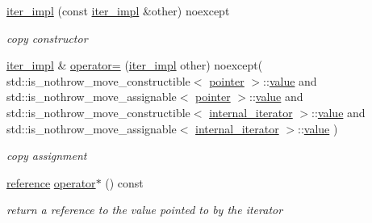 \begin{DoxyCompactItemize}
\item 
\hyperlink{classnlohmann_1_1basic__json_1_1iter__impl_a798792571cbbfc0e12025265b55498d2}{iter\+\_\+impl} (const \hyperlink{classnlohmann_1_1basic__json_1_1iter__impl}{iter\+\_\+impl} \&other) noexcept
\begin{DoxyCompactList}\small\item\em copy constructor \end{DoxyCompactList}\item 
\hyperlink{classnlohmann_1_1basic__json_1_1iter__impl}{iter\+\_\+impl} \& \hyperlink{classnlohmann_1_1basic__json_1_1iter__impl_a547f4519e43ff401010c21cc311b2546}{operator=} (\hyperlink{classnlohmann_1_1basic__json_1_1iter__impl}{iter\+\_\+impl} other) noexcept(                                       std\+::is\+\_\+nothrow\+\_\+move\+\_\+constructible$<$ \hyperlink{classnlohmann_1_1basic__json_1_1iter__impl_a3b56ff21ecdde2dc147288ee64cff0fd}{pointer} $>$\+::\hyperlink{classnlohmann_1_1basic__json_1_1iter__impl_a87177104a65f86ea6d324f334f0cca4e}{value} and                                       std\+::is\+\_\+nothrow\+\_\+move\+\_\+assignable$<$ \hyperlink{classnlohmann_1_1basic__json_1_1iter__impl_a3b56ff21ecdde2dc147288ee64cff0fd}{pointer} $>$\+::\hyperlink{classnlohmann_1_1basic__json_1_1iter__impl_a87177104a65f86ea6d324f334f0cca4e}{value} and                                       std\+::is\+\_\+nothrow\+\_\+move\+\_\+constructible$<$ \hyperlink{structnlohmann_1_1basic__json_1_1internal__iterator}{internal\+\_\+iterator} $>$\+::\hyperlink{classnlohmann_1_1basic__json_1_1iter__impl_a87177104a65f86ea6d324f334f0cca4e}{value} and                                       std\+::is\+\_\+nothrow\+\_\+move\+\_\+assignable$<$ \hyperlink{structnlohmann_1_1basic__json_1_1internal__iterator}{internal\+\_\+iterator} $>$\+::\hyperlink{classnlohmann_1_1basic__json_1_1iter__impl_a87177104a65f86ea6d324f334f0cca4e}{value}                       )
\begin{DoxyCompactList}\small\item\em copy assignment \end{DoxyCompactList}\item 
\hyperlink{classnlohmann_1_1basic__json_1_1iter__impl_a0e391c9035a242461d131b2dc0314256}{reference} \hyperlink{classnlohmann_1_1basic__json_1_1iter__impl_af9da27343a7876bccd1156eac4b6ca3b}{operator$\ast$} () const 
\begin{DoxyCompactList}\small\item\em return a reference to the value pointed to by the iterator \end{DoxyCompactList}\item 

\end{DoxyCompactItemize}
